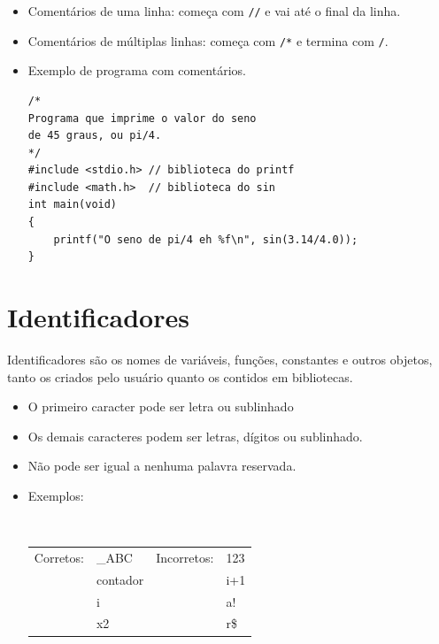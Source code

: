 \begin{itemize}

\item Comentários de uma linha: começa com {\tt //} e vai até o final da linha.
\item Comentários de múltiplas linhas: começa com {\tt /*} e termina com {\tt */}.

\item Exemplo de programa com comentários.

\begin{lstlisting}
/* 
Programa que imprime o valor do seno
de 45 graus, ou pi/4.
*/
#include <stdio.h> // biblioteca do printf
#include <math.h>  // biblioteca do sin
int main(void)
{
    printf("O seno de pi/4 eh %f\n", sin(3.14/4.0));
}
\end{lstlisting}


\end{itemize}


\section{Identificadores}
\label{sec:ident}

Identificadores são os nomes de variáveis, funções, constantes e outros objetos, tanto os criados pelo usuário quanto os contidos em bibliotecas.

\begin{itemize}
\item O primeiro caracter pode ser letra ou sublinhado
\item Os demais caracteres podem ser letras, dígitos ou sublinhado.
\item Não pode ser igual a nenhuma palavra reservada.
\item Exemplos:

{\tt
\begin{tabular}{llll}
Corretos:           & \_ABC                 & Incorretos:     & 123       \\
                    & contador              &                 & i+1       \\
                    & i                     &                 & a!        \\
                    & x2                    &                 & r\$       \\
\end{tabular}
}

\end{itemize}


